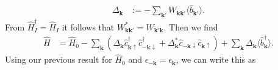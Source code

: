 \documentclass[english, parskip=full]{scrartcl}
\renewcommand{\bra}{}
\newcommand{\kla}{}
\newcommand{\klammer}{}
\begin{document}
\begin{align}
\Delta_{\mathbf{k}} &:= -\sum_{\mathbf{k}'} W_{\mathbf{k}\mathbf{k}'} \bra\langle \hat{b}_{\mathbf{k}'} \rangle.
\end{align}
From $\hat{H}_I^\dagger = \hat{H}_I$ it follows that $W_{\mathbf{k}\mathbf{k}'}^\ast = W_{\mathbf{k}'\mathbf{k}}$.
Then we find
\begin{align}
\hat{H} &= \hat{H}_0 - \sum_{\mathbf{k}} \kla\left( \Delta_{\mathbf{k}} \hat{c}_{\mathbf{k}\uparrow}^\dagger \hat{c}_{-\mathbf{k}\downarrow}^\dagger + \Delta_{\mathbf{k}}^\ast \hat{c}_{-\mathbf{k}\downarrow} \hat{c}_{\mathbf{k}\uparrow}  \right) + \sum_{\textbf{k}} \Delta_\textbf{k} \langle \hat{b}_{\mathbf{k}}^\dagger \rangle.
\end{align}
%
%
Using our previous result for $\hat{H}_0$ and $\epsilon_{-\mathbf{k}} =  \epsilon_{\mathbf{k}}$, we can write this as
\end{document}
